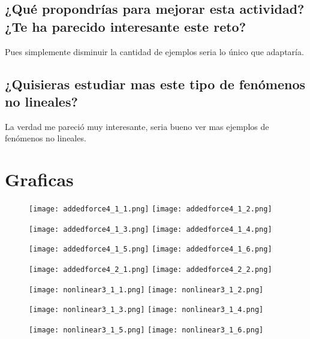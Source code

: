 \documentclass{article}
\begin{document}
\subsection{¿Qué propondrías para mejorar esta actividad? ¿Te ha parecido interesante este reto?}
Pues simplemente disminuir la cantidad de ejemplos seria lo único que adaptaría.
\subsection{¿Quisieras estudiar mas este tipo de fenómenos no lineales?}
La verdad me pareció muy interesante, seria bueno ver mas ejemplos de fenómenos no lineales.
\section{Graficas}
\begin{figure}
\texttt{[image: addedforce4\_1\_1.png]}
\texttt{[image: addedforce4\_1\_2.png]}
\end{figure}
\begin{figure}
\texttt{[image: addedforce4\_1\_3.png]}
\texttt{[image: addedforce4\_1\_4.png]}
\end{figure}
\begin{figure}
\texttt{[image: addedforce4\_1\_5.png]}
\texttt{[image: addedforce4\_1\_6.png]}
\end{figure}
\begin{figure}
\texttt{[image: addedforce4\_2\_1.png]}
\texttt{[image: addedforce4\_2\_2.png]}
\end{figure}
\begin{figure}
\texttt{[image: nonlinear3\_1\_1.png]}
\texttt{[image: nonlinear3\_1\_2.png]}
\end{figure}
\begin{figure}
\texttt{[image: nonlinear3\_1\_3.png]}
\texttt{[image: nonlinear3\_1\_4.png]}
\end{figure}
\begin{figure}
\texttt{[image: nonlinear3\_1\_5.png]}
\texttt{[image: nonlinear3\_1\_6.png]}
\end{figure}
\end{document}
